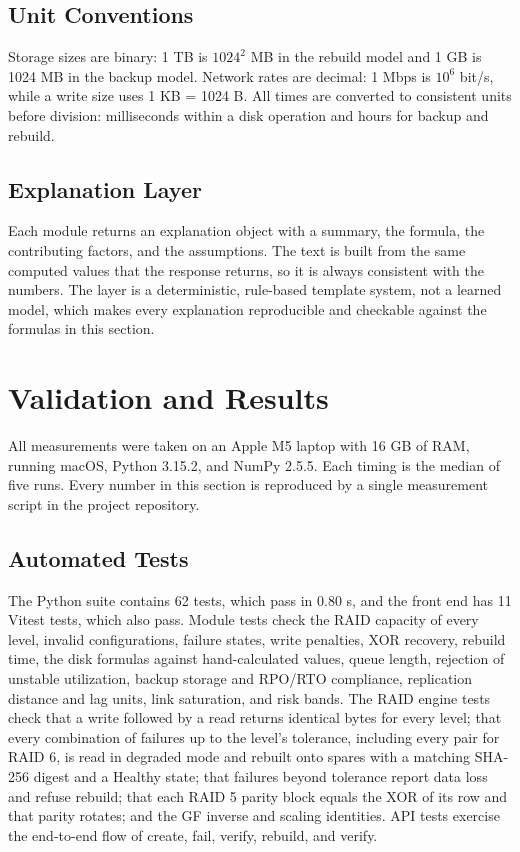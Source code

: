 \documentclass{ieeeaccess}
\begin{document}
\subsection{Unit Conventions}
Storage sizes are binary: 1 TB is $1024^2$ MB in the rebuild model and 1 GB is 1024 MB in the backup model. Network rates are decimal: 1 Mbps is $10^6$ bit/s, while a write size uses 1 KB = 1024 B. All times are converted to consistent units before division: milliseconds within a disk operation and hours for backup and rebuild.

\subsection{Explanation Layer}
Each module returns an explanation object with a summary, the formula, the contributing factors, and the assumptions. The text is built from the same computed values that the response returns, so it is always consistent with the numbers. The layer is a deterministic, rule-based template system, not a learned model, which makes every explanation reproducible and checkable against the formulas in this section.

\section{Validation and Results}
\label{sec:eval}

All measurements were taken on an Apple M5 laptop with 16 GB of RAM, running macOS, Python 3.15.2, and NumPy 2.5.5. Each timing is the median of five runs. Every number in this section is reproduced by a single measurement script in the project repository.

\subsection{Automated Tests}
The Python suite contains 62 tests, which pass in 0.80 s, and the front end has 11 Vitest tests, which also pass. Module tests check the RAID capacity of every level, invalid configurations, failure states, write penalties, XOR recovery, rebuild time, the disk formulas against hand-calculated values, queue length, rejection of unstable utilization, backup storage and RPO/RTO compliance, replication distance and lag units, link saturation, and risk bands. The RAID engine tests check that a write followed by a read returns identical bytes for every level; that every combination of failures up to the level's tolerance, including every pair for RAID 6, is read in degraded mode and rebuilt onto spares with a matching SHA-256 digest and a Healthy state; that failures beyond tolerance report data loss and refuse rebuild; that each RAID 5 parity block equals the XOR of its row and that parity rotates; and the GF inverse and scaling identities. API tests exercise the end-to-end flow of create, fail, verify, rebuild, and verify.
\end{document}
